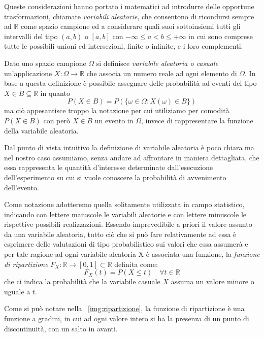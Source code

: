 \documentclass[a4paper,12pt, oneside]{book}
\newcommand{\numberset}{\mathbb}
\newcommand{\R}{\numberset{R}}
\begin{document}
Queste considerazioni hanno portato i matematici ad introdurre delle opportune trasformazioni,
chiamate \emph{variabili aleatorie}, che consentono di ricondursi sempre ad $\R$ come spazio campione
ed a considerare quali suoi sottoinsiemi tutti gli intervalli del tipo $(a,b)$ o $[a,b]$ 
con $-\infty \leq a < b \leq +\infty$ in cui sono comprese tutte le possibili unioni ed intersezioni, 
finite o infinite, e i loro complementi.

Dato uno spazio campione $\Omega$ si definisce \emph{variabile aleatoria o casuale} un'applicazione $X:\Omega \to \R$
che associa un numero reale ad ogni elemento di $\Omega$.\newline
In base a questa definizione è possibile assegnare delle probabilità ad eventi del tipo $X \in B \subseteq \R$ in quanto
\[ P(X \in B) = P(\{\omega \in \Omega : X(\omega) \in B\}) \]
ma ciò appesantisce troppo la notazione per cui utiliziamo per comodità $P(X \in B)$ con però $X \in B$ un evento in $\Omega$,
invece di rappresentare la funzione della variabile aleatoria.

Dal punto di vista intuitivo la definizione di variabile aleatoria è poco chiara ma nel nostro caso assumiamo,
senza andare ad affrontare in maniera dettagliata, che essa rappresenta le quantità d'interesse determinate
dall'esecuzione dell'esperimento su cui si vuole conoscere la probabilità di avvenimento dell'evento.

Come notazione adotteremo quella solitamente utilizzata in campo statistico,
indicando con lettere maiuscole le variabili aleatorie e con lettere minuscole le rispettive possibili realizzazioni.\newline
Essendo imprevedibile a priori il valore assunto da una variabile aleatoria, tutto ciò che si può fare 
relativamente ad essa è esprimere delle valutazioni di tipo probabilistico sui valori che essa assumerà
e per tale ragione ad ogni variabile aleatoria X è associata una funzione, la \emph{funzione di ripartizione}
$F_X: \R \to [0, 1] \subset \R$ definita come:
\[ F_X(t) = P(X \leq t) \quad \forall t \in \R \]
che ci indica la probabilità che la variabile casuale $X$ assuma un valore minore o uguale a $t$.

Come si può notare nella \figurename~\ref{img:ripartizione}, la funzione di ripartizione è una funzione a gradini,
in cui ad ogni valore intero si ha la presenza di un punto di discontinuità, con un salto in avanti.
\end{document}
